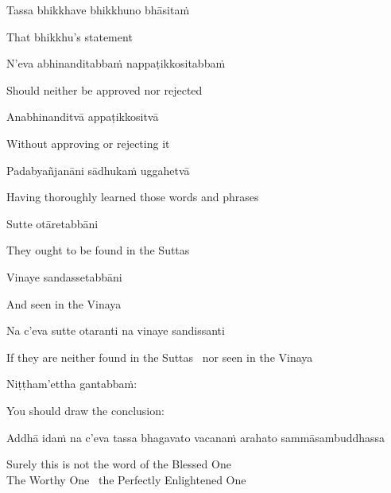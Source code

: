 Tassa bhikkhave bhikkhuno bhāsitaṁ

\begin{english}
  That bhikkhu's statement
\end{english}

N'eva abhinanditabbaṁ nappaṭikkositabbaṁ

\begin{english}
  Should neither be approved nor rejected
\end{english}

Anabhinanditvā appaṭikkositvā

\begin{english}
  Without approving or rejecting it
\end{english}

Padabyañjanāni sādhukaṁ uggahetvā

\begin{english}
  Having thoroughly learned those words and phrases
\end{english}

Sutte otāretabbāni

\begin{english}
  They ought to be found in the Suttas
\end{english}

Vinaye sandassetabbāni

\begin{english}
  And seen in the Vinaya
\end{english}

Na c'eva sutte otaranti na vinaye sandissanti

\begin{english}
  If they are neither found in the Suttas \breathmark\ nor seen in the Vinaya
\end{english}

\ifninebythirteenversion\clearpage\fi

Niṭṭham'ettha gantabbaṁ:

\begin{english}
  You should draw the conclusion:
\end{english}

\begin{pali-hang}
  Addhā idaṁ na c'eva tassa bhagavato vacanaṁ arahato sammāsambuddhassa
\end{pali-hang}

\begin{english}
  Surely this is not the word of the Blessed One\\
  The Worthy One \breathmark\ the Perfectly Enlightened One
\end{english}

